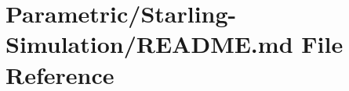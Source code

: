 \hypertarget{_parametric_2_starling-_simulation_2_r_e_a_d_m_e_8md}{}\section{Parametric/\+Starling-\/\+Simulation/\+R\+E\+A\+D\+ME.md File Reference}
\label{_parametric_2_starling-_simulation_2_r_e_a_d_m_e_8md}
